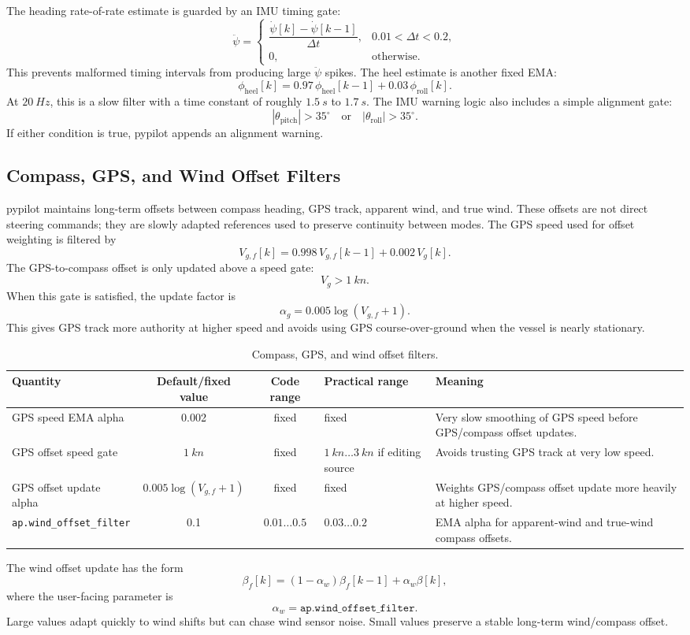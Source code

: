 \documentclass[11pt,twocolumn]{article}
\newcommand{\abs}[1]{\left\lvert #1 \right\rvert}
\begin{document}
The heading rate-of-rate estimate is guarded by an IMU timing gate:
\[
\ddot{\psi}
=
\begin{cases}
\dfrac{\dot{\psi}[k]-\dot{\psi}[k-1]}{\Delta t},
& \num{0.01} < \Delta t < \num{0.2},\\[8pt]
0, & \text{otherwise}.
\end{cases}
\]
This prevents malformed timing intervals from producing large
\(\ddot{\psi}\) spikes.
The heel estimate is another fixed EMA:
\[
\phi_{\mathrm{heel}}[k]
=
0.97\,\phi_{\mathrm{heel}}[k-1]
+
0.03\,\phi_{\mathrm{roll}}[k].
\]
At \(\SI{20}{Hz}\), this is a slow filter with a time constant of roughly
\(\SI{1.5}{s}\) to \(\SI{1.7}{s}\).
The IMU warning logic also includes a simple alignment gate:
\[
\abs{\theta_{\mathrm{pitch}}} > 35^\circ
\quad\text{or}\quad
\abs{\theta_{\mathrm{roll}}} > 35^\circ .
\]
If either condition is true, pypilot appends an alignment warning.
\subsection{Compass, GPS, and Wind Offset Filters}
pypilot maintains long-term offsets between compass heading, GPS track,
apparent wind, and true wind.  These offsets are not direct steering
commands; they are slowly adapted references used to preserve continuity
between modes.
The GPS speed used for offset weighting is filtered by
\[
V_{g,f}[k]
=
0.998\,V_{g,f}[k-1]
+
0.002\,V_g[k].
\]
The GPS-to-compass offset is only updated above a speed gate:
\[
V_g > \SI{1}{kn}.
\]
When this gate is satisfied, the update factor is
\[
\alpha_g
=
0.005\log(V_{g,f}+1).
\]
This gives GPS track more authority at higher speed and avoids using GPS
course-over-ground when the vessel is nearly stationary.
\begin{table}[t]
\centering
\caption{Compass, GPS, and wind offset filters.}
\label{tab:pypilot-offset-filters}
\begin{tabularx}{\textwidth}{Z{0.23\textwidth}c c Z{0.16\textwidth}Y}
\toprule
Quantity & Default/fixed value & Code range & Practical range & Meaning \\
\midrule
GPS speed EMA alpha &
\num{0.002} &
fixed &
fixed &
Very slow smoothing of GPS speed before GPS/compass offset updates. \\
GPS offset speed gate &
\(\SI{1}{kn}\) &
fixed &
\(\SI{1}{kn}\ldots\SI{3}{kn}\) if editing source &
Avoids trusting GPS track at very low speed. \\
GPS offset update alpha &
\(0.005\log(V_{g,f}+1)\) &
fixed &
fixed &
Weights GPS/compass offset update more heavily at higher speed. \\
\texttt{ap.wind\_offset\_filter} &
\num{0.1} &
\(\num{0.01}\ldots\num{0.5}\) &
\(\num{0.03}\ldots\num{0.2}\) &
EMA alpha for apparent-wind and true-wind compass offsets. \\
\bottomrule
\end{tabularx}
\end{table}
The wind offset update has the form
\[
\beta_f[k]
=
(1-\alpha_w)\beta_f[k-1]
+
\alpha_w \beta[k],
\]
where the user-facing parameter is
\[
\alpha_w = \texttt{ap.wind\_offset\_filter}.
\]
Large values adapt quickly to wind shifts but can chase wind sensor noise.
Small values preserve a stable long-term wind/compass offset.
\end{document}
